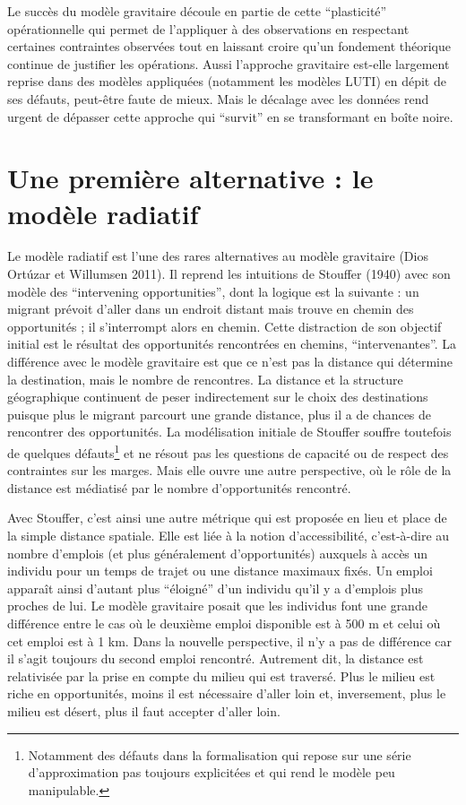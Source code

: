 \documentclass[
  10pt,
  a4paper,
  numbers=noendperiod,
  DIV=12]{scrartcl}
\begin{document}
Le succès du modèle gravitaire découle en partie de cette ``plasticité''
opérationnelle qui permet de l'appliquer à des observations en
respectant certaines contraintes observées tout en laissant croire qu'un
fondement théorique continue de justifier les opérations. Aussi
l'approche gravitaire est-elle largement reprise dans des modèles
appliquées (notamment les modèles LUTI) en dépit de ses défauts,
peut-être faute de mieux. Mais le décalage avec les données rend urgent
de dépasser cette approche qui ``survit'' en se transformant en boîte
noire.

\hypertarget{sec-rad}{%
\section{Une première alternative : le modèle radiatif}\label{sec-rad}}

Le modèle radiatif est l'une des rares alternatives au modèle gravitaire
(Dios Ortúzar et Willumsen 2011). Il reprend les intuitions de Stouffer
(1940) avec son modèle des ``intervening opportunities'', dont la
logique est la suivante : un migrant prévoit d'aller dans un endroit
distant mais trouve en chemin des opportunités ; il s'interrompt alors
en chemin. Cette distraction de son objectif initial est le résultat des
opportunités rencontrées en chemins, ``intervenantes''. La différence
avec le modèle gravitaire est que ce n'est pas la distance qui détermine
la destination, mais le nombre de rencontres. La distance et la
structure géographique continuent de peser indirectement sur le choix
des destinations puisque plus le migrant parcourt une grande distance,
plus il a de chances de rencontrer des opportunités. La modélisation
initiale de Stouffer souffre toutefois de quelques défauts\footnote{Notamment
  des défauts dans la formalisation qui repose sur une série
  d'approximation pas toujours explicitées et qui rend le modèle peu
  manipulable.} et ne résout pas les questions de capacité ou de respect
des contraintes sur les marges. Mais elle ouvre une autre perspective,
où le rôle de la distance est médiatisé par le nombre d'opportunités
rencontré.

Avec Stouffer, c'est ainsi une autre métrique qui est proposée en lieu
et place de la simple distance spatiale. Elle est liée à la notion
d'accessibilité, c'est-à-dire au nombre d'emplois (et plus généralement
d'opportunités) auxquels à accès un individu pour un temps de trajet ou
une distance maximaux fixés. Un emploi apparaît ainsi d'autant plus
``éloigné'' d'un individu qu'il y a d'emplois plus proches de lui. Le
modèle gravitaire posait que les individus font une grande différence
entre le cas où le deuxième emploi disponible est à 500 m et celui où
cet emploi est à 1 km. Dans la nouvelle perspective, il n'y a pas de
différence car il s'agit toujours du second emploi rencontré. Autrement
dit, la distance est relativisée par la prise en compte du milieu qui
est traversé. Plus le milieu est riche en opportunités, moins il est
nécessaire d'aller loin et, inversement, plus le milieu est désert, plus
il faut accepter d'aller loin.
\end{document}
